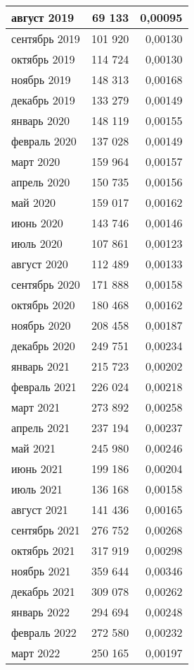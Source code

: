 \begin{longtable}[h!]{|l|r|r|}
\hline
август 2019 & 69 133 & 0,00095 \\
\hline
сентябрь 2019 & 101 920 & 0,00130 \\
\hline
октябрь 2019 & 114 724 & 0,00130 \\
\hline
ноябрь 2019 & 148 313 & 0,00168 \\
\hline
декабрь 2019 & 133 279 & 0,00149 \\
\hline
январь 2020 & 148 119 & 0,00155 \\
\hline
февраль 2020 & 137 028 & 0,00149 \\
\hline
март 2020 & 159 964 & 0,00157 \\
\hline
апрель 2020 & 150 735 & 0,00156 \\
\hline
май 2020 & 159 017 & 0,00162 \\
\hline
июнь 2020 & 143 746 & 0,00146 \\
\hline
июль 2020 & 107 861 & 0,00123 \\
\hline
август 2020 & 112 489 & 0,00133 \\
\hline
сентябрь 2020 & 171 888 & 0,00158 \\
\hline
октябрь 2020 & 180 468 & 0,00162 \\
\hline
ноябрь 2020 & 208 458 & 0,00187 \\
\hline
декабрь 2020 & 249 751 & 0,00234 \\
\hline
январь 2021 & 215 723 & 0,00202 \\
\hline
февраль 2021 & 226 024 & 0,00218 \\
\hline
март 2021 & 273 892 & 0,00258 \\
\hline
апрель 2021 & 237 194 & 0,00237 \\
\hline
май 2021 & 245 980 & 0,00246 \\
\hline
июнь 2021 & 199 186 & 0,00204 \\
\hline
июль 2021 & 136 168 & 0,00158 \\
\hline
август 2021 & 141 436 & 0,00165 \\
\hline
сентябрь 2021 & 276 752 & 0,00268 \\
\hline
октябрь 2021 & 317 919 & 0,00298 \\
\hline
ноябрь 2021 & 359 644 & 0,00346 \\
\hline
декабрь 2021 & 309 078 & 0,00262 \\
\hline
январь 2022 & 294 694 & 0,00248 \\
\hline
февраль 2022 & 272 580 & 0,00232 \\
\hline
март 2022 & 250 165 & 0,00197 \\

\end{longtable}

